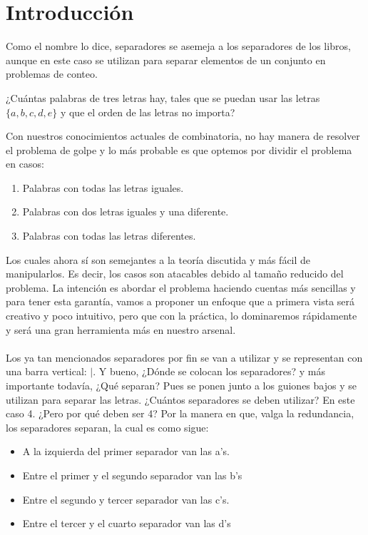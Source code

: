 \section{Introducción}
Como  el  nombre  lo  dice,  separadores  se  asemeja  a  los  separadores de los libros, aunque en este caso se utilizan para separar elementos de un conjunto en problemas de conteo.
\begin{ejemplo}
¿Cuántas palabras de tres letras hay, tales que se puedan usar las letras $\{a,b,c,d,e\}$ y que el orden de las letras no importa?    
\end{ejemplo}
\begin{solucion}
Con nuestros conocimientos actuales de combinatoria, no hay manera de resolver el problema de golpe y lo más probable es que optemos por dividir el problema en casos:
\begin{enumerate}
    \item Palabras con todas las letras iguales.
    \item Palabras con dos letras iguales y una diferente.
    \item Palabras con todas las letras diferentes.
\end{enumerate}
Los cuales ahora sí son semejantes a la teoría discutida y más fácil de manipularlos. Es decir, los casos son atacables debido al tamaño reducido del problema. La intención es abordar el problema haciendo cuentas más sencillas y para tener esta garantía, vamos a proponer un enfoque que a primera vista será creativo y poco intuitivo, pero que con la práctica, lo dominaremos rápidamente y será una gran herramienta más en nuestro arsenal.\\\\
Los ya tan mencionados separadores por fin se van a utilizar y se representan con una barra vertical: $|$.
Y bueno, ¿Dónde se colocan los separadores? y más importante todavía, ¿Qué separan? Pues se ponen junto a los guiones bajos y se utilizan para separar las letras. ¿Cuántos separadores se deben utilizar? En este caso 4. ¿Pero por qué deben ser 4? Por la manera en que, valga la redundancia, los separadores separan, la cual es como sigue:
\begin{itemize}
    \item A la izquierda del primer separador van las a’s.
    \item Entre el primer y el segundo separador van las b’s
    \item Entre el segundo y tercer separador van las c’s.
    \item Entre el tercer y el cuarto separador van las d’s

\end{itemize}
\end{solucion}
